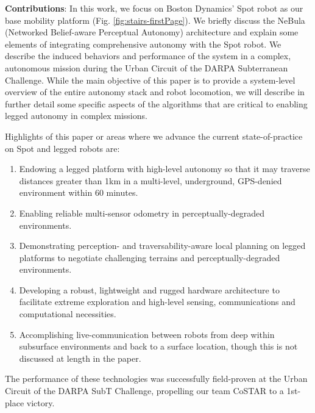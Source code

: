 \documentclass[letterpaper, 10pt, conference]{ieeeconf}      %
\newcommand{\ph}[1]{{\textbf{#1}:}} %
\newcommand{\rev}[1]{{\color{blue}#1}} %
\begin{document}
\ph{Contributions} %
In this work, we focus on Boston Dynamics' Spot robot \rev{as our base mobility platform} (Fig. \ref{fig:stairs-firstPage}). 
We briefly discuss the NeBula (Networked Belief-aware Perceptual Autonomy) architecture and explain some elements of integrating comprehensive autonomy %
\rev{with} the Spot robot.
We describe the induced behaviors and performance of the system in a complex, autonomous mission during the Urban Circuit of the DARPA Subterranean Challenge.
While the main objective of this paper is to provide a system-level overview of the entire autonomy stack and robot locomotion, we will describe in further detail some specific aspects of the algorithms that are critical to enabling legged autonomy in complex missions. 

Highlights of this paper or areas where we advance the current state-of-practice on Spot and legged robots are:
\begin{enumerate}
    \item Endowing a legged platform with high-level autonomy so that it may traverse %
    distances greater than 1km in a multi-level, underground, GPS-denied environment within 60 minutes. 
    \item Enabling reliable multi-sensor odometry in perceptually-degraded environments.
    \item Demonstrating perception- and traversability-aware local planning on legged platforms to negotiate challenging terrains 
    and perceptually-degraded environments.
    \item Developing a robust, lightweight and rugged hardware architecture to facilitate extreme exploration and high-level sensing, communications and computational necessities.
    \item \rev{Accomplishing live-communication between robots from deep within subsurface environments and back to a surface location, though this is not discussed at length in the paper.} %
\end{enumerate}
The performance of these technologies was successfully field-proven at the Urban Circuit of the DARPA SubT Challenge, propelling our team CoSTAR to a 1st-place victory.
\end{document}
